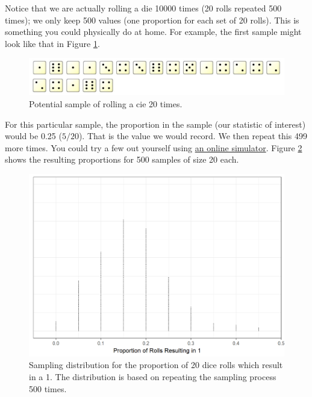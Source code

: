 \documentclass[]{book}
\theoremstyle{definition}
\theoremstyle{definition}
\theoremstyle{definition}
\theoremstyle{remark}
\begin{document}
Notice that we are actually rolling a die 10000 times (20 rolls repeated
500 times); we only keep 500 values (one proportion for each set of 20
rolls). This is something you could physically do at home. For example,
the first sample might look like that in Figure
\ref{fig:samplingdistns-dice-example}.

\begin{figure}

{\centering \includegraphics[width=0.8\linewidth]{./images/SamplingDistns-Dice-Example} 

}

\caption{Potential sample of rolling a cie 20 times.}\label{fig:samplingdistns-dice-example}
\end{figure}

For this particular sample, the proportion in the sample (our statistic
of interest) would be 0.25 (\(5/20\)). That is the value we would
record. We then repeat this 499 more times. You could try a few out
yourself using \href{https://www.random.org/dice/?num=20}{an online
simulator}. Figure \ref{fig:samplingdistns-dice-dotplot} shows the
resulting proportions for 500 samples of size 20 each.

\begin{figure}

{\centering \includegraphics[width=0.8\linewidth]{./Images/samplingdistns-dice-dotplot-1} 

}

\caption{Sampling distribution for the proportion of 20 dice rolls which result in a 1.  The distribution is based on repeating the sampling process 500 times.}\label{fig:samplingdistns-dice-dotplot}
\end{figure}
\end{document}
